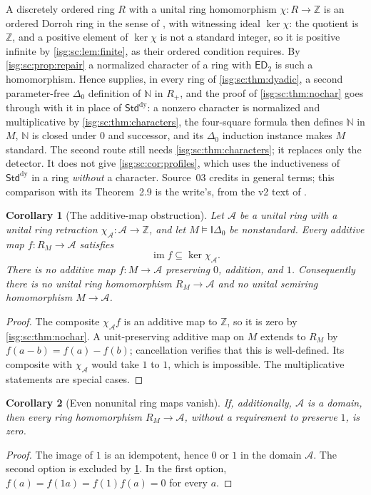 \documentclass[11pt]{article}
\newtheorem{corollary}[corollary]{Corollary}
\theoremstyle{definition}
\theoremstyle{remark}
\newcommand{\Z}{\mathbb{Z}}
\newcommand{\N}{\mathbb{N}}
\newcommand{\StdDy}{\mathsf{Std}^{\mathrm{dy}}}
\newcommand{\ED}{\mathsf{ED}}
\newcommand{\Idelta}{\mathsf{I}\Delta_0}
\newcommand{\im}{\operatorname{im}}
\newcommand{\Asc}{\mathcal{A}}
\begin{document}
\begin{remark}\label{isg:sc:rem:ELV}
A discretely ordered ring $R$ with a unital ring homomorphism
$\chi:R\to\Z$ is an ordered Dorroh ring in the sense of
\cite[Section~2.5]{ELV}, with witnessing ideal $\ker\chi$: the quotient is
$\Z$, and a positive element of $\ker\chi$ is not a standard integer, so
it is positive infinite by \cref{isg:sc:lem:finite}, as their ordered
condition requires. By \cref{isg:sc:prop:repair} a normalized character of
a ring with $\ED_2$ is such a homomorphism. Hence
\cite[Theorem~2.9]{ELV} supplies, in every ring of
\cref{isg:sc:thm:dyadic}, a second parameter-free $\Delta_0$ definition of
$\N$ in $R_+$, and the proof of \cref{isg:sc:thm:nochar} goes through
with it in place of $\StdDy$: a nonzero character is normalized and
multiplicative by \cref{isg:sc:thm:characters}, the four-square formula
then defines $\N$ in $M$, $\N$ is closed under $0$ and successor, and its
$\Delta_0$ induction instance makes $M$ standard. The second route still
needs \cref{isg:sc:thm:characters}; it replaces only the detector. It does
not give \cref{isg:sc:cor:profiles}, which uses the inductiveness of
$\StdDy$ in a ring \emph{without} a character. Source~03 credits
\cite[Section~2.5]{ELV} in general terms; this comparison with its
Theorem~2.9 is the write's, from the v2 text of \cite{ELV}.
\end{remark}

\begin{corollary}[The additive-map obstruction]\label{isg:sc:cor:noadd}
Let $\Asc$ be a unital ring with a unital ring retraction
$\chi_{\Asc}:\Asc\to\Z$, and let $M\models\Idelta$ be nonstandard. Every
additive map $f:R_M\to\Asc$ satisfies
\[
 \im f\subseteq\ker\chi_{\Asc}.
\]
There is no additive map $f:M\to\Asc$ preserving $0$, addition, and $1$.
Consequently there is no unital ring homomorphism $R_M\to\Asc$ and no
unital semiring homomorphism $M\to\Asc$.
\end{corollary}
\begin{proof}
The composite $\chi_{\Asc}f$ is an additive map to $\Z$, so it is zero by
\cref{isg:sc:thm:nochar}. A unit-preserving additive map on $M$ extends
to $R_M$ by $f(a-b)=f(a)-f(b)$; cancellation verifies that this is
well-defined. Its composite with $\chi_{\Asc}$ would take $1$ to $1$,
which is impossible. The multiplicative statements are special cases.
\end{proof}

\begin{corollary}[Even nonunital ring maps vanish]\label{isg:sc:cor:nonunital}
If, additionally, $\Asc$ is a domain, then every ring homomorphism
$R_M\to\Asc$, without a requirement to preserve $1$, is zero.
\end{corollary}
\begin{proof}
The image of $1$ is an idempotent, hence $0$ or $1$ in the domain $\Asc$.
The second option is excluded by \cref{isg:sc:cor:noadd}. In the first
option, $f(a)=f(1a)=f(1)f(a)=0$ for every $a$.
\end{proof}
\end{document}

